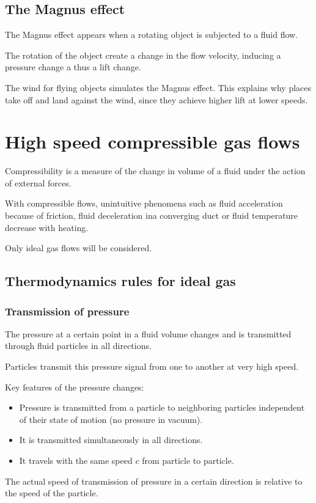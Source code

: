 \documentclass[10pt, twocolumn]{article}
\begin{document}
\subsection{The Magnus effect}
The Magnus effect appears when a rotating object is subjected to a fluid flow.

The rotation of the object create a change in the flow velocity, inducing a pressure change a thus a lift change.

The wind for flying objects simulates the Magnus effect.
This explains why places take off and land against the wind, since they achieve higher lift at lower speeds.


\section{High speed compressible gas flows}
Compressibility is a measure of the change in volume of a fluid under the action of external forces.

With compressible flows, unintuitive phenomena such as fluid acceleration because of friction, fluid deceleration ina converging duct or fluid temperature decrease with heating.

Only ideal gas flows will be considered.


\subsection{Thermodynamics rules for ideal gas}
\subsubsection{Transmission of pressure}
The pressure at a certain point in a fluid volume changes and is transmitted through fluid particles in all directions.

Particles transmit this pressure signal from one to another at very high speed.

Key features of the pressure changes:
\begin{itemize}
  \item Pressure is transmitted from a particle to neighboring particles independent of their state of motion (no pressure in vacuum).
  \item It is transmitted simultaneously in all directions.
  \item It travels with the same speed \(c\) from particle to particle.
\end{itemize}

The actual speed of transmission of pressure in a certain direction is relative to the speed of the particle.
\end{document}
